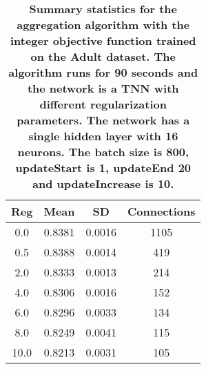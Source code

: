 \begin{center}
\begin{table}[!tb]
\centering
\begin{tabular}{|c|c|c|c|}
  \hline
Reg & Mean & SD & Connections \\ 
  \hline
 0.0 & 0.8381 & 0.0016 & 1105 \\ 
   \hline
 0.5 & 0.8388 & 0.0014 &  419 \\ 
   \hline
 2.0 & 0.8333 & 0.0013 &  214 \\ 
   \hline
 4.0 & 0.8306 & 0.0016 &  152 \\ 
   \hline
 6.0 & 0.8296 & 0.0033 &  134 \\ 
   \hline
 8.0 & 0.8249 & 0.0041 &  115 \\ 
   \hline
10.0 & 0.8213 & 0.0031 &  105 \\ 
   \hline
\end{tabular}
\caption{\small{\textbf{Summary statistics for the aggregation algorithm with the integer objective function trained on the Adult
            dataset. The algorithm runs for 90 seconds and the network is a TNN with different 
            regularization parameters. The network has a single hidden layer with 16 neurons. The batch size
            is 800, updateStart is 1, updateEnd 20 and updateIncrease is 10.}}} 
\label{MBT_REG_Adult}
\end{table}

\end{center}
